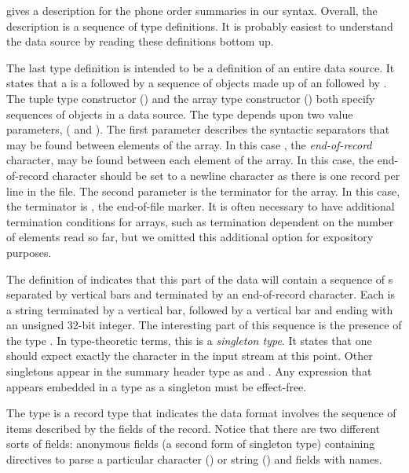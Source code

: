  gives a \datatype{} description for the
\dibbler{} phone order summaries in our syntax.  Overall, the description 
is a sequence of type definitions.  It is probably
easiest to understand the data source by reading these definitions
bottom up.

The last type definition  is intended to be a definition of
an entire \dibbler{} data source.  It states that a
 is a  followed by a sequence of
objects made up of an  followed by .  The
tuple type constructor () and the array type constructor
() both specify sequences of objects in a data
source.  The  type depends upon two value parameters,
( and ).  The first parameter describes the syntactic
separators that may be found between elements of the array.  In this
case , the {\em end-of-record} character, may be found 
between each element
of the array.  In this case, the end-of-record character 
should be set to a newline character as there is one record per
line in the file.   
The second parameter is the
terminator for the array.  In this case, the terminator is , the
end-of-file marker.  It is often necessary to have additional
termination conditions for arrays, such as termination dependent on
the number of elements read so far, but we omitted this additional option 
for expository purposes.

The definition of  indicates that this part of the
\dibbler{} data will contain a sequence of s separated by
vertical bars and terminated by an end-of-record character.  
Each  is a
string terminated by a vertical bar, followed by a vertical bar and
ending with an unsigned 32-bit integer.  The interesting part of this
sequence is the presence of the type .  In type-theoretic
terms, this is a {\em singleton type}.  It states that one should
expect exactly the character  in the input stream at this
point.  Other singletons appear in the summary header type as
 and .  Any expression that appears embedded in a type
as a singleton must be effect-free.

The type  is a record type that indicates
the data format involves the sequence of items described by
the fields of the record.  Notice that there are two different
sorts of fields: anonymous fields (a second form of singleton type) 
containing directives to parse a particular character () or
string ()
and fields with names.  

